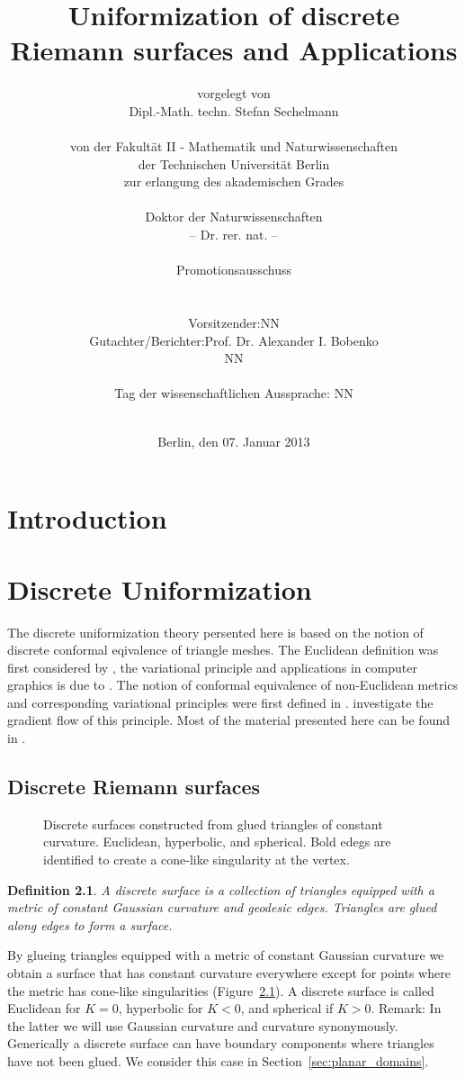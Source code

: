 \documentclass{book}
\title{Uniformization of discrete Riemann surfaces and Applications}
\author{
vorgelegt von\\
Dipl.-Math. techn. Stefan Sechelmann\\
\vspace{0.3cm}\\
von der Fakult{\"a}t II - Mathematik und Naturwissenschaften\\
der Technischen Universit{\"a}t Berlin\\
zur erlangung des akademischen Grades\\
\vspace{0.3cm}\\
Doktor der Naturwissenschaften\\
-- Dr. rer. nat. --\\
\vspace{2cm}\\
Promotionsausschuss\\
\vspace{0.3cm}\\
\begin{tabular}{rl}
Vorsitzender: & NN \\
Gutachter/Berichter: & Prof. Dr. Alexander I. Bobenko \\
& NN 
\end{tabular}
\vspace{0.3cm}\\
Tag der wissenschaftlichen Aussprache: NN\\
\vspace{2cm}\\
}
\date{Berlin, den 07. Januar 2013}
\newtheorem{definition}{Definition}
\begin{document}
\frontmatter
\maketitle
\newpage

\tableofcontents
\newpage
\listoffigures

\newpage
\mainmatter
\chapter{Introduction}


\chapter{Discrete Uniformization}

The discrete uniformization theory persented here is based on the notion of discrete conformal eqivalence of triangle meshes. The Euclidean definition was first considered by \cite{Luo2004}, the variational principle and applications in computer graphics is due to \cite{Springborn2008, OWF2009, Bobenko2010}. The notion of conformal equivalence of non-Euclidean metrics and corresponding variational principles were first defined in \cite{Bobenko2010}. \cite{Guo2011} investigate the gradient flow of this principle.
Most of the material presented here can be found in \cite{BobSechSpr}.

\section{Discrete Riemann surfaces}

\begin{figure}
\centering
\scalebox{0.8}{}
\caption[Discrete surfaces from glued triangles]{Discrete surfaces constructed from glued triangles of constant curvature. Euclidean, hyperbolic, and spherical. Bold edegs are identified to create a cone-like singularity at the vertex.}
\label{fig:surface_triangles}
\end{figure}

\begin{definition}
A \emph{discrete surface} is a collection of triangles equipped with a metric of constant Gaussian curvature and geodesic edges. Triangles are glued along edges to form a surface.
\end{definition}

By glueing triangles equipped with a metric of constant Gaussian curvature we obtain a surface that has constant curvature everywhere except for points where the metric has cone-like singularities (Figure~\ref{fig:surface_triangles}). A discrete surface is called Euclidean for $K=0$, hyperbolic for $K<0$, and spherical if $K>0$.
Remark: In the latter we will use Gaussian curvature and curvature synonymously.
Generically a discrete surface can have boundary components where triangles have not been glued. We consider this case in Section~\ref{sec:planar_domains}. 
\end{document}
